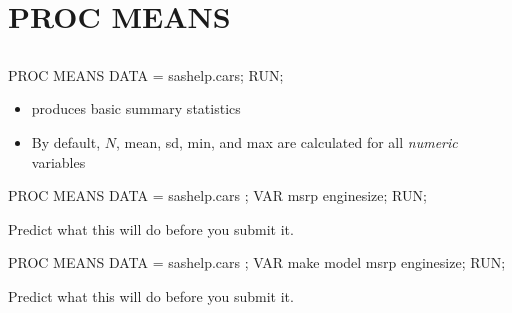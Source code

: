 \section[PROC MEANS]{PROC MEANS}
\subsection{}
\begin{frame}
\end{frame}


\begin{frame}[fragile]
\footnotesize
\begin{code}{.0}
PROC MEANS DATA = sashelp.cars;
RUN;
\end{code}
\emp
\vskip10pt
\begin{itemize}
    \item {} produces basic summary statistics 
    \item By default, $N$, mean, sd, min, and max are calculated for all \emph{numeric} variables
\end{itemize}
\end{frame}


\begin{frame}[fragile]
\footnotesize
\begin{code}{.0}
PROC MEANS DATA = sashelp.cars ;
	VAR msrp enginesize;
RUN;
\end{code}
\emp
\vskip20pt
\oyo Predict what this will do before you submit it.
\end{frame}

\begin{frame}[fragile]
\footnotesize
\begin{code}{.0}
PROC MEANS DATA = sashelp.cars ;
	VAR make model msrp enginesize;
RUN;
\end{code}
\emp
\vskip20pt
\oyo Predict what this will do before you submit it.
\end{frame}

